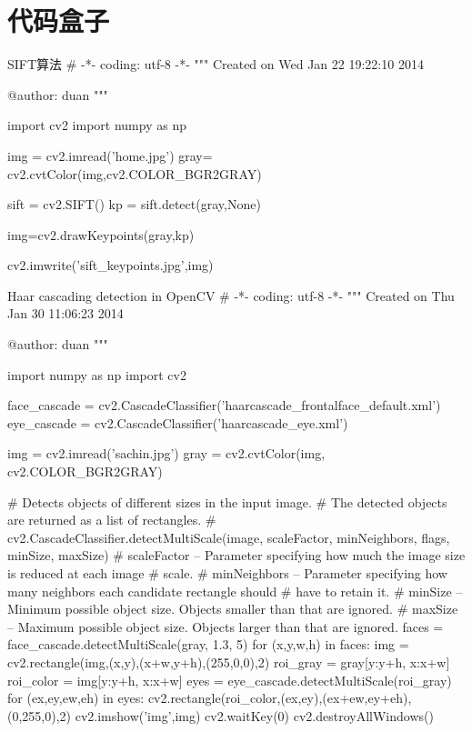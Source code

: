 \documentclass{lsbook}
\begin{document}
\chapter{代码盒子}
\begin{langCVOne}{SIFT算法}
# -*- coding: utf-8 -*-
"""
Created on Wed Jan 22 19:22:10 2014

@author: duan
"""

import cv2
import numpy as np

img = cv2.imread('home.jpg')
gray= cv2.cvtColor(img,cv2.COLOR_BGR2GRAY)

sift = cv2.SIFT()
kp = sift.detect(gray,None)

img=cv2.drawKeypoints(gray,kp)

cv2.imwrite('sift_keypoints.jpg',img)
\end{langCVOne}
\begin{langPyOne}{Haar cascading detection in OpenCV}
# -*- coding: utf-8 -*-
"""
Created on Thu Jan 30 11:06:23 2014

@author: duan
"""

import numpy as np
import cv2

face_cascade = cv2.CascadeClassifier('haarcascade_frontalface_default.xml')
eye_cascade = cv2.CascadeClassifier('haarcascade_eye.xml')

img = cv2.imread('sachin.jpg')
gray = cv2.cvtColor(img, cv2.COLOR_BGR2GRAY)

# Detects objects of different sizes in the input image.
# The detected objects are returned as a list of rectangles.
# cv2.CascadeClassifier.detectMultiScale(image, scaleFactor, minNeighbors, flags, minSize, maxSize)
# scaleFactor – Parameter specifying how much the image size is reduced at each image
# scale.
# minNeighbors – Parameter specifying how many neighbors each candidate rectangle should
# have to retain it.
# minSize – Minimum possible object size. Objects smaller than that are ignored.
# maxSize – Maximum possible object size. Objects larger than that are ignored.
faces = face_cascade.detectMultiScale(gray, 1.3, 5)
for (x,y,w,h) in faces:
    img = cv2.rectangle(img,(x,y),(x+w,y+h),(255,0,0),2)
    roi_gray = gray[y:y+h, x:x+w]
    roi_color = img[y:y+h, x:x+w]
    eyes = eye_cascade.detectMultiScale(roi_gray)
    for (ex,ey,ew,eh) in eyes:
        cv2.rectangle(roi_color,(ex,ey),(ex+ew,ey+eh),(0,255,0),2)
cv2.imshow('img',img)
cv2.waitKey(0)
cv2.destroyAllWindows()
\end{langPyOne}
\end{document}
